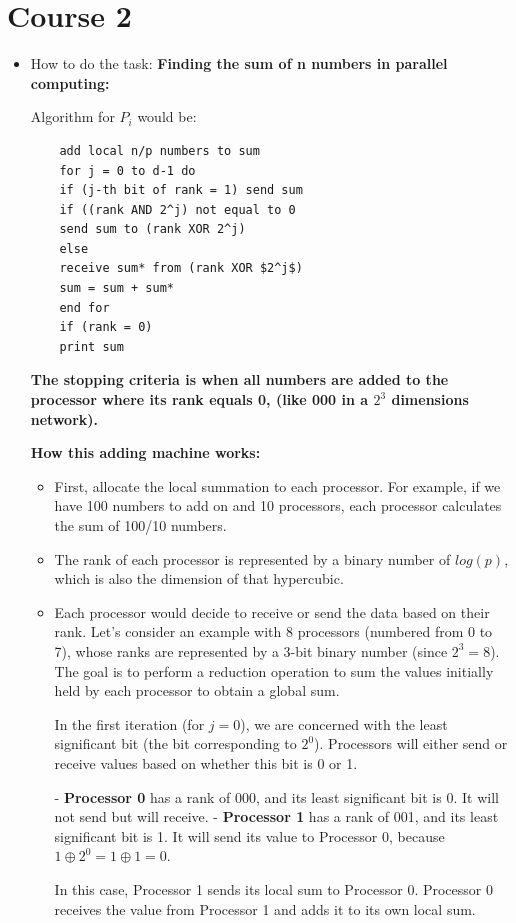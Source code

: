 \documentclass{article}
\begin{document}
\section{Course 2}
\begin{itemize}
    \item How to do the task: \textbf{Finding the sum of n numbers in parallel computing:}\par
    Algorithm for $P_i$ would be:\par
    \begin{verbatim}
    add local n/p numbers to sum
    for j = 0 to d-1 do
    if (j-th bit of rank = 1) send sum
    if ((rank AND 2^j) not equal to 0
    send sum to (rank XOR 2^j)
    else
    receive sum* from (rank XOR $2^j$)
    sum = sum + sum*
    end for
    if (rank = 0)
    print sum
      \end{verbatim}
\textbf{The stopping criteria is when all numbers are added to the processor where its rank equals 0, (like 000 in a $2^3$ dimensions network).}\par
      \textbf{How this adding machine works:}
      \begin{itemize}
          \item First, allocate the local summation to each processor. For example, if we have 100 numbers to add on and 10 processors, each processor calculates the sum of 100/10 numbers.
          \item The rank of each processor is represented by a binary number of $log(p)$, which is also the dimension of that hypercubic.
          \item Each processor would decide to receive or send the data based on their rank.
          Let's consider an example with 8 processors (numbered from 0 to 7), whose ranks are represented by a 3-bit binary number (since \(2^3 = 8\)). The goal is to perform a reduction operation to sum the values initially held by each processor to obtain a global sum.

In the first iteration (for \(j=0\)), we are concerned with the least significant bit (the bit corresponding to \(2^0\)). Processors will either send or receive values based on whether this bit is 0 or 1.

- \textbf{Processor 0} has a rank of 000, and its least significant bit is 0. It will not send but will receive.
- \textbf{Processor 1} has a rank of 001, and its least significant bit is 1. It will send its value to Processor 0, because \(1 \oplus 2^0 = 1 \oplus 1 = 0\).

In this case, Processor 1 sends its local sum to Processor 0. Processor 0 receives the value from Processor 1 and adds it to its own local sum.


\end{itemize}
\end{itemize}
\end{document}
